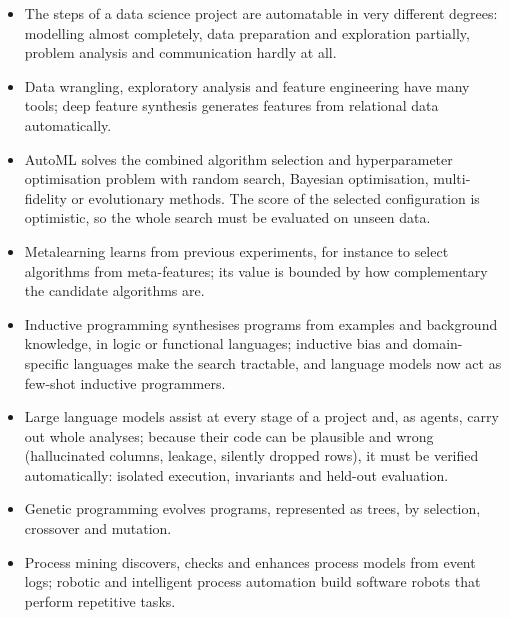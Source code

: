 \begin{itemize}
  \item The steps of a data science project are automatable in very different degrees: modelling
        almost completely, data preparation and exploration partially, problem analysis and
        communication hardly at all.
  \item Data wrangling, exploratory analysis and feature engineering have many tools; deep feature
        synthesis generates features from relational data automatically.
  \item AutoML solves the combined algorithm selection and hyperparameter optimisation problem with
        random search, Bayesian optimisation, multi-fidelity or evolutionary methods. The score of the
        selected configuration is optimistic, so the whole search must be evaluated on unseen data.
  \item Metalearning learns from previous experiments, for instance to select algorithms from
        meta-features; its value is bounded by how complementary the candidate algorithms are.
  \item Inductive programming synthesises programs from examples and background knowledge, in logic or
        functional languages; inductive bias and domain-specific languages make the search tractable,
        and language models now act as few-shot inductive programmers.
  \item Large language models assist at every stage of a project and, as agents, carry out whole analyses;
        because their code can be plausible and wrong (hallucinated columns, leakage, silently dropped rows),
        it must be verified automatically: isolated execution, invariants and held-out evaluation.
  \item Genetic programming evolves programs, represented as trees, by selection, crossover and
        mutation.
  \item Process mining discovers, checks and enhances process models from event logs; robotic and
        intelligent process automation build software robots that perform repetitive tasks.
\end{itemize}

